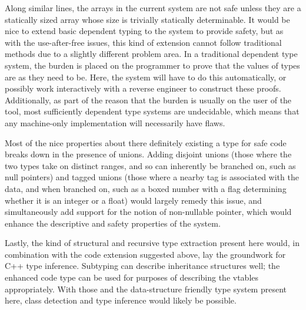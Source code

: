 Along similar lines, the arrays in the current system are not safe unless they are a statically sized array whose size is trivially statically determinable. It would be nice to extend basic dependent typing to the system to provide safety, but as with the use-after-free issues, this kind of extension cannot follow traditional methods due to a slightly different problem area. In a traditional dependent type system, the burden is placed on the programmer to prove that the values of types are as they need to be. Here, the system will have to do this automatically, or possibly work interactively with a reverse engineer to construct these proofs. Additionally, as part of the reason that the burden is usually on the user of the tool, most sufficiently dependent type systems are undecidable, which means that any machine-only implementation will necessarily have flaws.

Most of the nice properties about there definitely existing a type for safe code breaks down in the presence of unions. Adding disjoint unions (those where the two types take on distinct ranges, and so can inherently be branched on, such as null pointers) and tagged unions (those where a nearby tag is associated with the data, and when branched on, such as a boxed number with a flag determining whether it is an integer or a float) would largely remedy this issue, and simultaneously add support for the notion of non-nullable pointer, which would enhance the descriptive and safety properties of the system.

Lastly, the kind of structural and recursive type extraction present here would, in combination with the code extension suggested above, lay the groundwork for C++ type inference. Subtyping can describe inheritance structures well; the enhanced code type can be used for purposes of describing the vtables appropriately. With those and the data-structure friendly type system present here, class detection and type inference would likely be possible.
